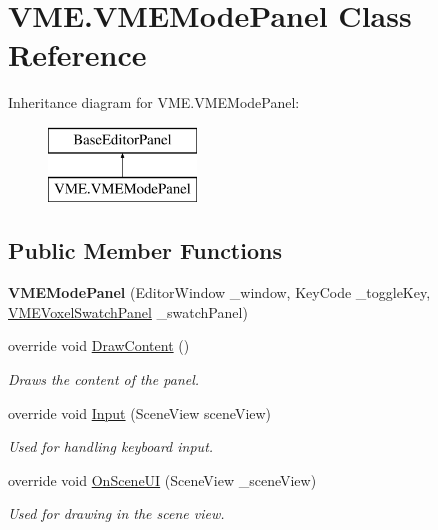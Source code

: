 \hypertarget{class_v_m_e_1_1_v_m_e_mode_panel}{}\section{V\+M\+E.\+V\+M\+E\+Mode\+Panel Class Reference}
\label{class_v_m_e_1_1_v_m_e_mode_panel}
Inheritance diagram for V\+M\+E.\+V\+M\+E\+Mode\+Panel\+:\begin{figure}[H]
\begin{center}
\leavevmode
\includegraphics[height=2.000000cm]{class_v_m_e_1_1_v_m_e_mode_panel}
\end{center}
\end{figure}
\subsection*{Public Member Functions}
\begin{DoxyCompactItemize}
\item 
{\bfseries V\+M\+E\+Mode\+Panel} (Editor\+Window \+\_\+window, Key\+Code \+\_\+toggle\+Key, \hyperlink{class_v_m_e_1_1_v_m_e_voxel_swatch_panel}{V\+M\+E\+Voxel\+Swatch\+Panel} \+\_\+swatch\+Panel)\hypertarget{class_v_m_e_1_1_v_m_e_mode_panel_a6be58880200d43400636c18ff751c55d}{}\label{class_v_m_e_1_1_v_m_e_mode_panel_a6be58880200d43400636c18ff751c55d}

\item 
override void \hyperlink{class_v_m_e_1_1_v_m_e_mode_panel_ab60ed5d8ad208884843eb77a0633986d}{Draw\+Content} ()
\begin{DoxyCompactList}\small\item\em Draws the content of the panel. \end{DoxyCompactList}\item 
override void \hyperlink{class_v_m_e_1_1_v_m_e_mode_panel_adef41bb2208966390ef8557311fd576f}{Input} (Scene\+View scene\+View)
\begin{DoxyCompactList}\small\item\em Used for handling keyboard input. \end{DoxyCompactList}\item 
override void \hyperlink{class_v_m_e_1_1_v_m_e_mode_panel_a20fc99c3b9d0dc77b0b8bd72ed070177}{On\+Scene\+UI} (Scene\+View \+\_\+scene\+View)
\begin{DoxyCompactList}\small\item\em Used for drawing in the scene view. \end{DoxyCompactList}\end{DoxyCompactItemize}
